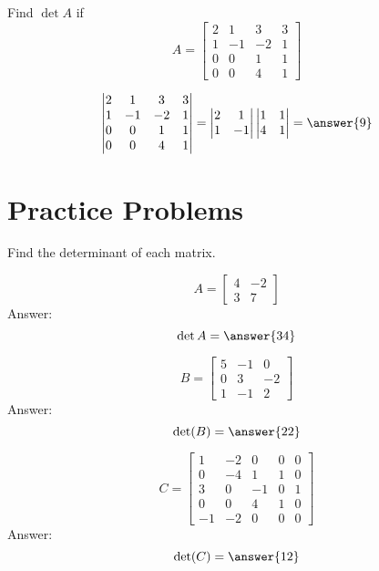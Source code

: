 \documentclass{ximera}
\begin{document}
\begin{example}\label{ex:blockTriDet}
    Find $\det{A}$ if 
    $$A=\begin{bmatrix}2&1&3&3\\1&-1&-2&1\\0&0&1&1\\0&0&4&1\end{bmatrix}$$
  \begin{explanation}
      $$\begin{vmatrix}2&1&3&3\\1&-1&-2&1\\0&0&1&1\\0&0&4&1\end{vmatrix}=\begin{vmatrix}2&1\\1&-1\end{vmatrix}\begin{vmatrix}1&1\\4&1\end{vmatrix}=\answer{9}$$
  \end{explanation}  
\end{example}


\section*{Practice Problems}

\begin{problem}
Find the determinant of each matrix.
  \begin{problem}\label{prob:2x2det1}
  $$A=\begin{bmatrix}4&-2\\3&7\end{bmatrix}$$
  Answer:
  $$\det{A}=\answer{34}$$
  \end{problem}
  
  \begin{problem}\label{prob:2x2det2}
  $$B=\begin{bmatrix}5&-1&0\\0&3&-2\\1&-1&2\end{bmatrix}$$
  Answer:
  $$\text{det}(B)=\answer{22}$$
  \end{problem}

  \begin{problem}\label{prob:laplace}
  $$C=\begin{bmatrix}1&-2&0&0&0\\0&-4&1&1&0\\3&0&-1&0&1\\0&0&4&1&0\\-1&-2&0&0&0\end{bmatrix}$$
   Answer:
  $$\det(C)=\answer{12}$$
 \end{problem}
\end{problem}
\end{document}

